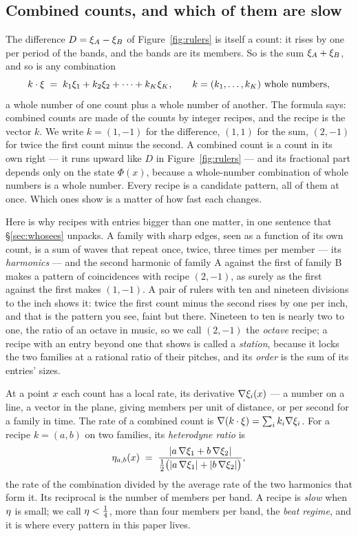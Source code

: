 \subsection{Combined counts, and which of them are slow}
\label{sec:slow}

The difference $D=\xi_A-\xi_B$ of Figure~\ref{fig:rulers} is itself a
count: it rises by one per period of the bands, and the bands are its
members. So is the sum $\xi_A+\xi_B$, and so is any combination
\[
  k\cdot\xi \;=\; k_1\xi_1+k_2\xi_2+\dots+k_K\xi_K,
  \qquad k=(k_1,\dots,k_K)\ \text{whole numbers},
\]
a whole number of one count plus a whole number of another. The formula says:
combined counts are made of the counts by integer recipes, and the recipe is
the vector $k$. We write $k=(1,-1)$ for the difference, $(1,1)$ for the sum,
$(2,-1)$ for twice the first count minus the second. A combined count is a
count in its own right --- it runs upward like $D$ in Figure~\ref{fig:rulers}
--- and its fractional part depends only on the state $\Phi(x)$, because a
whole-number combination of whole numbers is a whole number. Every recipe is
a candidate pattern, all of them at once. Which ones show is a matter of how
fast each changes.

Here is why recipes with entries bigger than one matter, in one sentence
that \S\ref{sec:whosees} unpacks. A family with sharp edges, seen as a
function of its own count, is a sum of waves that repeat once, twice, three
times per member --- its \emph{harmonics} --- and the second harmonic of
family A against the first of family B makes a pattern of coincidences with
recipe $(2,-1)$, as surely as the first against the first makes $(1,-1)$.
A pair of rulers with ten and nineteen divisions to the inch shows it:
twice the first count minus the second rises by one per inch, and that is
the pattern you see, faint but there. Nineteen to ten is nearly two to one,
the ratio of an octave in music, so we call $(2,-1)$ the \emph{octave}
recipe; a recipe with an entry beyond one that shows is called a
\emph{station}, because it locks the two families at a rational ratio of
their pitches, and its \emph{order} is the sum of its entries' sizes.

\begin{definition}
\label{def:eta}
At a point $x$ each count has a local rate, its derivative $\nabla\xi_i(x)$
--- a number on a line, a vector in the plane, giving members per unit of
distance, or per second for a family in time. The rate of a combined count is $\nabla(k\cdot\xi)=\sum_ik_i\nabla\xi_i$.
For a recipe $k=(a,b)$ on two families, its \emph{heterodyne ratio} is
\[
  \eta_{a,b}(x)\;=\;\frac{\lvert a\,\nabla\xi_1+b\,\nabla\xi_2\rvert}
                        {\tfrac12\big(\lvert a\,\nabla\xi_1\rvert+\lvert b\,\nabla\xi_2\rvert\big)},
\]
the rate of the combination divided by the average rate of the two
harmonics that form it. Its reciprocal is the number of members per band.
A recipe is \emph{slow} when $\eta$ is small; we call $\eta<\tfrac14$, more
than four members per band, the \emph{beat regime}, and it is where every
pattern in this paper lives.
\end{definition}

